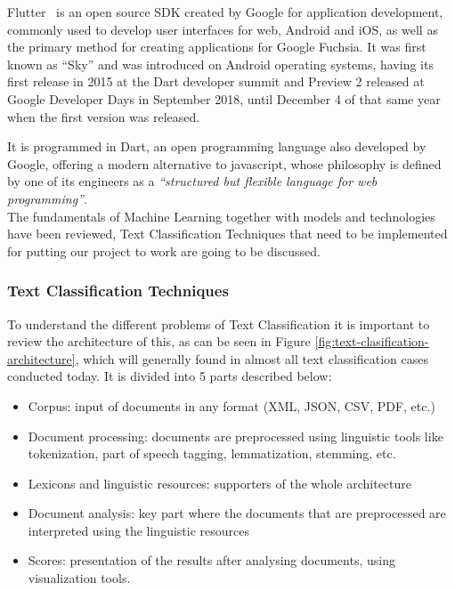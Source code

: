 Flutter~\cite{FlutterB22:online} is an open source SDK created by Google for application development, commonly used to develop user interfaces for web, Android and iOS, as well as the primary method for creating applications for Google Fuchsia. It was first known as ``Sky'' and was introduced on Android operating systems, having its first release in 2015 at the Dart developer summit and Preview 2 released at Google Developer Days in September 2018, until December 4 of that same year when the first version was released.

It is programmed in Dart, an open programming language also developed by Google, offering a modern alternative to javascript, whose philosophy is defined by one of its engineers as a \textit{``structured but flexible language for web programming''}.\\


The fundamentals of Machine Learning together with models and technologies have been reviewed, Text Classification Techniques that need to be implemented for putting our project to work are going to be discussed.

\subsubsection{Text Classification Techniques}

To understand the different problems of Text Classification it is important to review the architecture of this, as can be seen in Figure \ref{fig:text-clasification-architecture}, which will generally found in almost all text classification cases conducted today. It is divided into 5 parts described below:


\begin{itemize}
    \item Corpus: input of documents in any format (XML, JSON, CSV, PDF, etc.)
    \item Document processing: documents are preprocessed using linguistic tools like tokenization, part of speech tagging, lemmatization, stemming, etc.
    \item Lexicons and linguistic resources: supporters of the whole architecture
    \item Document analysis: key part where the documents that are preprocessed are interpreted using the linguistic resources
    \item Scores: presentation of the results after analysing documents, using visualization tools.
\end{itemize}


